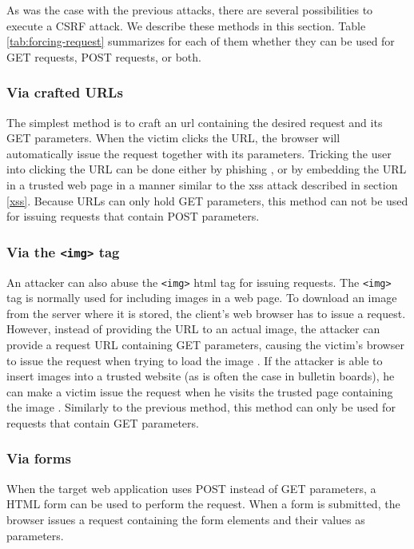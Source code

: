 As was the case with the previous attacks, there are several possibilities to execute a CSRF attack. We describe these methods in this section. Table \ref{tab:forcing-request} summarizes for each of them whether they can be used for GET requests, POST requests, or both.

\subsubsection{Via crafted URLs}

The simplest method is to craft an \gls{url} containing the desired request and its GET parameters. When the victim clicks the URL, the browser will automatically issue the request together with its parameters. Tricking the user into clicking the URL can be done either by phishing \cite{Barth2008}, or by embedding the URL in a trusted web page in a manner similar to the \gls{xss} attack described in section \ref{xss}. Because URLs can only hold GET parameters, this method can not be used for issuing requests that contain POST parameters.

\subsubsection{Via the \texttt{<img>} tag}

An attacker can also abuse the \texttt{<img>} \gls{html} tag for issuing requests. The \texttt{<img>} tag is normally used for including images in a web page. To download an image from the server where it is stored, the client's web browser has to issue a request. However, instead of providing the URL to an actual image, the attacker can provide a request URL containing GET parameters, causing the victim's browser to issue the request when trying to load the image \cite{Johns2006b}. If the attacker is able to insert images into a trusted website (as is often the case in bulletin boards), he can make a victim issue the request when he visits the trusted page containing the image \cite{Barth2008}. Similarly to the previous method, this method can only be used for requests that contain GET parameters.

\subsubsection{Via forms}\label{forms}

When the target web application uses POST instead of GET parameters, a HTML form can be used to perform the request. When a form is submitted, the browser issues a request containing the form elements and their values as parameters.

